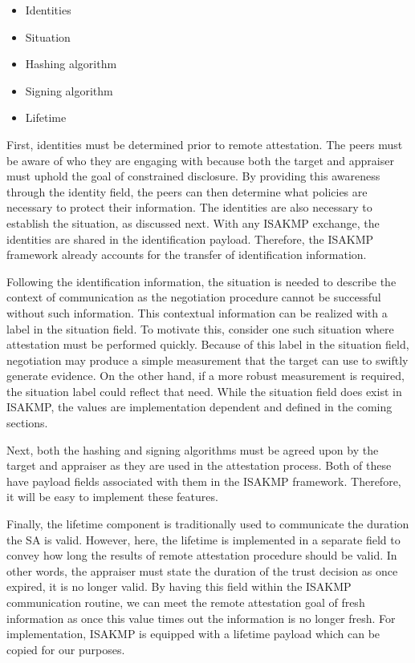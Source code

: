 \documentclass[12pt, letterpaper, twoside]{article}
\newcommand{\squash}{\itemsep=0pt\parskip=0pt}
\begin{document}
\begin{itemize}
\squash
    \item Identities
    \item Situation
    \item Hashing algorithm
    \item Signing algorithm
    \item Lifetime
\end{itemize}


First, identities must be determined prior to remote attestation. The peers must be aware of who they are engaging with because both the target and appraiser must uphold the goal of constrained disclosure. By providing this awareness through the identity field, the peers can then determine what policies are necessary to protect their information. The identities are also necessary to establish the situation, as discussed next. With any ISAKMP exchange, the identities are shared in the identification payload. Therefore, the ISAKMP framework already accounts for the transfer of identification information. 

Following the identification information, the situation is needed to describe the context of communication as the negotiation procedure cannot be successful without such information. This contextual information can be realized with a label in the situation field. To motivate this, consider one such situation where attestation must be performed quickly. Because of this label in the situation field, negotiation may produce a simple measurement that the target can use to swiftly generate evidence. On the other hand, if a more robust measurement is required, the situation label could reflect that need. While the situation field does exist in ISAKMP, the values are implementation dependent and defined in the coming sections. 

Next, both the hashing and signing algorithms must be agreed upon by the target and appraiser as they are used in the attestation process. Both of these have payload fields associated with them in the ISAKMP framework. Therefore, it will be easy to implement these features. 

Finally, the lifetime component is traditionally used to communicate the duration the SA is valid. However, here, the lifetime is implemented in a  separate field to convey how long the results of remote attestation procedure should be valid. In other words, the appraiser must state the duration of the trust decision as once expired, it is no longer valid. By having this field within the ISAKMP communication routine, we can meet the remote attestation goal of fresh information as once this value times out the information is no longer fresh. For implementation, ISAKMP is equipped with a lifetime payload which can be copied for our purposes.
\end{document}
